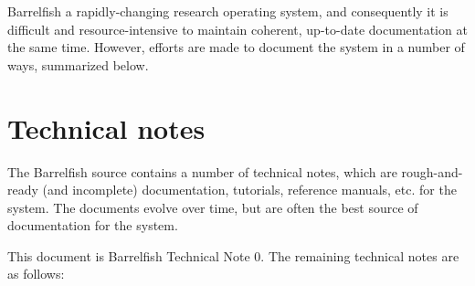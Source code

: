 \documentclass[a4paper,twoside]{report} %
\begin{document}
Barrelfish a rapidly-changing research operating system, and
consequently it is difficult and resource-intensive to maintain
coherent, up-to-date documentation at the same time.  However, efforts
are made to document the system in a number of ways, summarized below.

\section{Technical notes}

The Barrelfish source contains a number of technical notes, which are
rough-and-ready (and incomplete) documentation, tutorials, reference
manuals, etc. for the system.  The documents evolve over time, but are
often the best source of documentation for the system. 

This document is Barrelfish Technical Note 0.  The remaining technical
notes are as follows:
\end{document}

